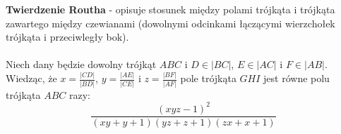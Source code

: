 \documentclass[14pt,a4paper]{extarticle}
\begin{document}
\hfill\break
\noindent \textbf{Twierdzenie Routha} - opisuje stosunek między polami trójkąta i trójkąta zawartego
między czewianami (dowolnymi odcinkami łączącymi wierzchołek trójkąta i przeciwległy bok).\\\\
Niech dany będzie dowolny trójkąt $ABC$ i $D \in \vert BC\vert$, $E \in \vert AC\vert$ i $F \in \vert AB\vert$.
Wiedząc, że $x = \frac{\vert CD\vert}{\vert BD\vert}$, $y = \frac{\vert AE\vert}{\vert CE\vert}$ i
$z = \frac{\vert BF\vert}{\vert AF\vert}$ pole trójkąta $GHI$ jest równe polu trójkąta $ABC$ razy:
$$\dfrac{(xyz - 1)^{2}}{(xy + y +1)(yz + z + 1)(zx + x + 1)}$$

\newpage
\end{document}
